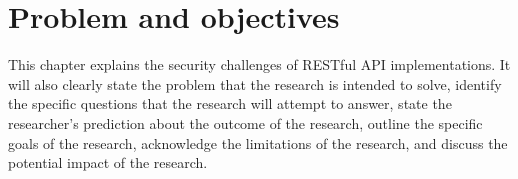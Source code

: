 \chapter{Problem and objectives}

This chapter explains the security challenges of RESTful API implementations. It will also clearly state the problem that the research is intended to solve, identify the specific questions that the research will attempt to answer, state the researcher’s prediction about the outcome of the research, outline the specific goals of the research, acknowledge the limitations of the research, and discuss the potential impact of the research.